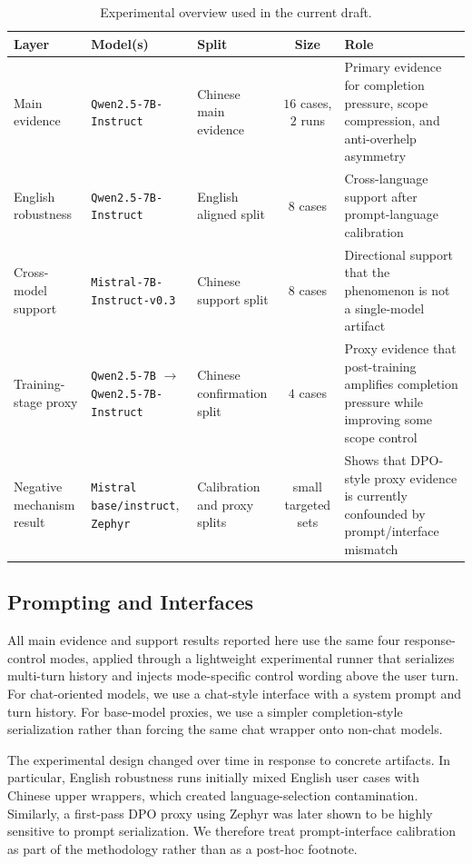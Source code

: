 \documentclass[11pt]{article}
\begin{document}
\begin{table}[t]
\centering
\small
\caption{Experimental overview used in the current draft.}
\label{tab:exp-overview}
\begin{tabularx}{\linewidth}{l l l c Y}
\toprule
Layer & Model(s) & Split & Size & Role \\
\midrule
Main evidence & \texttt{Qwen2.5-7B-Instruct} & Chinese main evidence & $16$ cases, $2$ runs & Primary evidence for completion pressure, scope compression, and anti-overhelp asymmetry \\
English robustness & \texttt{Qwen2.5-7B-Instruct} & English aligned split & $8$ cases & Cross-language support after prompt-language calibration \\
Cross-model support & \texttt{Mistral-7B-Instruct-v0.3} & Chinese support split & $8$ cases & Directional support that the phenomenon is not a single-model artifact \\
Training-stage proxy & \texttt{Qwen2.5-7B} $\rightarrow$ \texttt{Qwen2.5-7B-Instruct} & Chinese confirmation split & $4$ cases & Proxy evidence that post-training amplifies completion pressure while improving some scope control \\
Negative mechanism result & \texttt{Mistral base/instruct}, \texttt{Zephyr} & Calibration and proxy splits & small targeted sets & Shows that DPO-style proxy evidence is currently confounded by prompt/interface mismatch \\
\bottomrule
\end{tabularx}
\end{table}

\subsection{Prompting and Interfaces}
All main evidence and support results reported here use the same four response-control modes, applied through a lightweight experimental runner that serializes multi-turn history and injects mode-specific control wording above the user turn. For chat-oriented models, we use a chat-style interface with a system prompt and turn history. For base-model proxies, we use a simpler completion-style serialization rather than forcing the same chat wrapper onto non-chat models.

The experimental design changed over time in response to concrete artifacts. In particular, English robustness runs initially mixed English user cases with Chinese upper wrappers, which created language-selection contamination. Similarly, a first-pass DPO proxy using Zephyr was later shown to be highly sensitive to prompt serialization. We therefore treat prompt-interface calibration as part of the methodology rather than as a post-hoc footnote.
\end{document}
